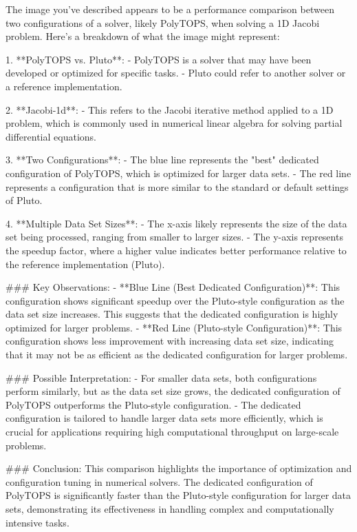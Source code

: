 The image you've described appears to be a performance comparison between two configurations of a solver, likely PolyTOPS, when solving a 1D Jacobi problem. Here's a breakdown of what the image might represent:

1. **PolyTOPS vs. Pluto**: 
   - PolyTOPS is a solver that may have been developed or optimized for specific tasks.
   - Pluto could refer to another solver or a reference implementation.

2. **Jacobi-1d**:
   - This refers to the Jacobi iterative method applied to a 1D problem, which is commonly used in numerical linear algebra for solving partial differential equations.

3. **Two Configurations**:
   - The blue line represents the "best" dedicated configuration of PolyTOPS, which is optimized for larger data sets.
   - The red line represents a configuration that is more similar to the standard or default settings of Pluto.

4. **Multiple Data Set Sizes**:
   - The x-axis likely represents the size of the data set being processed, ranging from smaller to larger sizes.
   - The y-axis represents the speedup factor, where a higher value indicates better performance relative to the reference implementation (Pluto).

### Key Observations:
- **Blue Line (Best Dedicated Configuration)**: This configuration shows significant speedup over the Pluto-style configuration as the data set size increases. This suggests that the dedicated configuration is highly optimized for larger problems.
- **Red Line (Pluto-style Configuration)**: This configuration shows less improvement with increasing data set size, indicating that it may not be as efficient as the dedicated configuration for larger problems.

### Possible Interpretation:
- For smaller data sets, both configurations perform similarly, but as the data set size grows, the dedicated configuration of PolyTOPS outperforms the Pluto-style configuration.
- The dedicated configuration is tailored to handle larger data sets more efficiently, which is crucial for applications requiring high computational throughput on large-scale problems.

### Conclusion:
This comparison highlights the importance of optimization and configuration tuning in numerical solvers. The dedicated configuration of PolyTOPS is significantly faster than the Pluto-style configuration for larger data sets, demonstrating its effectiveness in handling complex and computationally intensive tasks.